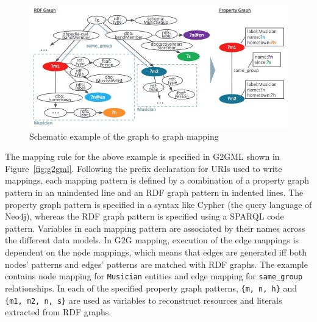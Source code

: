 \documentclass[runningheads]{llncs}
\begin{document}
\begin{figure}
\center
\includegraphics[width=1.0\textwidth]{example.jpg}
\caption{Schematic example of the graph to graph mapping}
\label{fig:conversion}
\end{figure}
 
The mapping rule for the above example is specified in G2GML shown in Figure~\ref{fig:g2gml}. Following the prefix declaration for URIs used to write mappings, each mapping pattern is defined by a combination of a property graph pattern in an unindented line and an RDF graph pattern in indented lines. The property graph pattern is specified in a syntax like Cypher (the query language of Neo4j), whereas the RDF graph pattern is specified using a SPARQL code pattern. 
Variables in each mapping pattern are associated by their names across the different data models. 
In G2G mapping, execution of the edge mappings is dependent on the node mappings, which means that edges are generated iff both nodes' patterns and edges' patterns are matched with RDF graphs. 
The example contains node mapping for \texttt{Musician} entities and edge mapping for \texttt{same\_group} relationships.
In each of the specified property graph patterns, \texttt{\{m, n, h\}} and \texttt{\{m1, m2, n, s\}} are used as variables to reconstruct resources and literals extracted from RDF graphs. 
 
\end{document}
